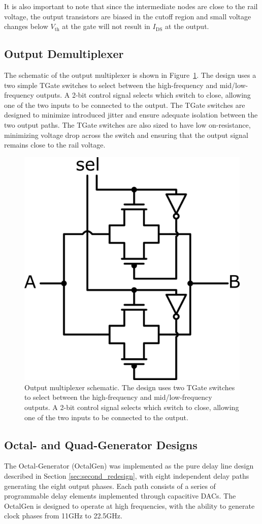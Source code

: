 It is also important to note that since the intermediate nodes are close to the rail voltage, the output transistors are biased in the cutoff region and small voltage changes below \(V_\text{th}\) at the gate will not result in \(I_\text{DS}\) at the output.

\subsection{Output Demultiplexer}

The schematic of the output multiplexer is shown in Figure~\ref{fig:output_mux}. The design uses a two simple TGate switches to select between the high-frequency and mid/low-frequency outputs.
A 2-bit control signal selects which switch to close, allowing one of the two inputs to be connected to the output. The TGate switches are designed to minimize introduced jitter and ensure adequate isolation between the two output paths. The TGate switches are also sized to have low on-resistance, minimizing voltage drop across the switch and ensuring that the output signal remains close to the rail voltage.

\begin{figure}[H]
  \centering
  \includegraphics[width=0.3\linewidth]{figures/Schematics/output_mux.png}
  \caption{Output multiplexer schematic. The design uses two TGate switches to select between the high-frequency and mid/low-frequency outputs. A 2-bit control signal selects which switch to close, allowing one of the two inputs to be connected to the output.}
  \label{fig:output_mux}
\end{figure}


\subsection{Octal- and Quad-Generator Designs}\label{sec:octal_quad_gen_design}

The Octal-Generator (OctalGen) was implemented as the pure delay line design described in Section \ref{sec:second_redesign}, with eight independent delay paths generating the eight output phases. Each path consists of a series of programmable delay elements implemented through capacitive DACs. The OctalGen is designed to operate at high frequencies, with the ability to generate clock phases from 11GHz to 22.5GHz. 

